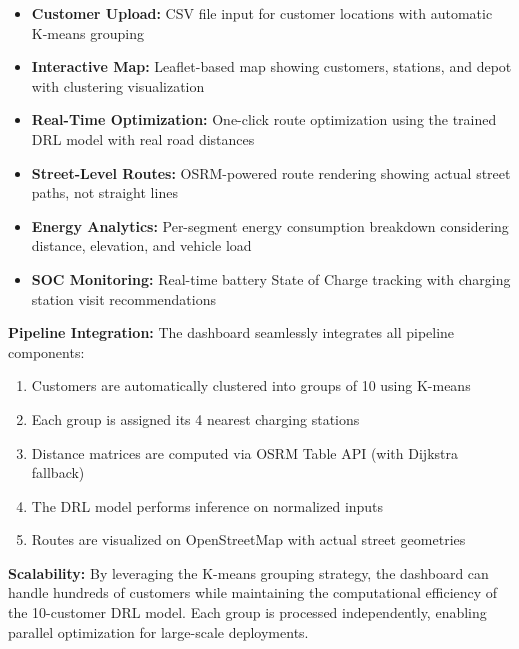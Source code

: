 \documentclass[11pt,a4paper]{article}
\begin{document}
\begin{itemize}
    \item \textbf{Customer Upload:} CSV file input for customer locations with automatic K-means grouping
    \item \textbf{Interactive Map:} Leaflet-based map showing customers, stations, and depot with clustering visualization
    \item \textbf{Real-Time Optimization:} One-click route optimization using the trained DRL model with real road distances
    \item \textbf{Street-Level Routes:} OSRM-powered route rendering showing actual street paths, not straight lines
    \item \textbf{Energy Analytics:} Per-segment energy consumption breakdown considering distance, elevation, and vehicle load
    \item \textbf{SOC Monitoring:} Real-time battery State of Charge tracking with charging station visit recommendations
\end{itemize}

\textbf{Pipeline Integration:} The dashboard seamlessly integrates all pipeline components:
\begin{enumerate}
    \item Customers are automatically clustered into groups of 10 using K-means
    \item Each group is assigned its 4 nearest charging stations
    \item Distance matrices are computed via OSRM Table API (with Dijkstra fallback)
    \item The DRL model performs inference on normalized inputs
    \item Routes are visualized on OpenStreetMap with actual street geometries
\end{enumerate}

\textbf{Scalability:} By leveraging the K-means grouping strategy, the dashboard can handle hundreds of customers while maintaining the computational efficiency of the 10-customer DRL model. Each group is processed independently, enabling parallel optimization for large-scale deployments.
\end{document}
